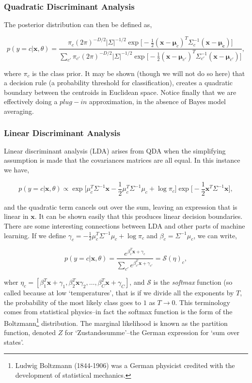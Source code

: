 \documentclass[11pt]{amsart}
\begin{document}
\subsubsection{Quadratic Discriminant Analysis}

The posterior distribution can then be defined as,

$$p(y = c|\mathbf{x}, \theta) = \frac{\pi_c(2\pi)^{-D/2}|\Sigma|^{-1/2}\exp\big[-\frac{1}{2}(\mathbf{x} - \mathbf{\mu}_c)^T\Sigma_c^{-1}(\mathbf{x} - \mathbf{\mu_c})\big]}{\sum_{c'}\pi_{c'}(2\pi)^{-D/2}|\Sigma|^{-1/2}\exp\big[-\frac{1}{2}(\mathbf{x} - \mathbf{\mu}_{c'})^T\Sigma_{c'}^{-1}(\mathbf{x} - \mathbf{\mu}_{c'})\big]},$$

where $\pi_c$ is the class prior. It may be shown (though we will not do so here) that a decision rule (a probability threshold for classification), creates a quadratic boundary between the centroids in Euclidean space. Notice finally that we are effectively doing a $plug-in$ approximation, in the absence of Bayes model averaging.

\subsubsection{Linear Discriminant Analysis}

Linear discriminant analysis (LDA) arises from QDA when the simplifying assumption is made that the covariances matrices are all equal. In this instance we have,

$$p(y = c|\mathbf{x}, \theta) \propto \exp\Big[\mu_c^T\Sigma^{-1}\mathbf{x} - \frac{1}{2}\mu_c^T\Sigma^{-1}\mu_c + \log\pi_c\Big]\exp\Big[-\frac{1}{2}\mathbf{x}^T\Sigma^{-1}\mathbf{x}\Big],$$

and the quadratic term cancels out over the sum, leaving an expression that is linear in $\mathbf{x}$. It can be shown easily that this produces linear decision boundaries. There are some interesting connections between LDA and other parts of machine learning. If we define $\gamma_c = - \frac{1}{2}\mu_c^T\Sigma^{-1}\mu_c + \log\pi_c$ and $\beta_c = \Sigma^{-1}\mu_c$, we can write,

$$p(y = c|\mathbf{x}, \theta) = \frac{e^{\beta_c^T\mathbf{x} + \gamma_c}}{\sum_{c'}e^{\beta_{c'}^T\mathbf{x} + \gamma_{c'}}} = \mathcal{S}({\eta})_c,$$

wher $\eta_c = [\beta_1^T\mathbf{x} + \gamma_1, \beta_2^T\mathbf{x} \gamma_2 , \dots, \beta_C^T\mathbf{x} + \gamma_C]$, and $\mathcal{S}$ is the \emph{softmax} function (so called because at low `temperatures', that is if we divide all the exponents by $T$, the probability of the most likely class goes to $1$ as $T \to 0$. This terminology comes from statistical physics--in fact the softmax function is the form of the Boltzmann\footnote{Ludwig Boltzmann (1844-1906) was a German physicist credited with the development of statistical mechanics.} distribution. The marginal likelihood is known as the partition function, denoted $Z$ for `Zustandssumme'--the German expression for `sum over states'.
\end{document}
